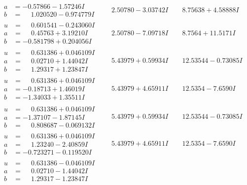 \documentclass[1p]{elsarticle_modified}
\theoremstyle{definition}
\begin{document}
$$\begin{array}{c|c|c}
\begin{aligned}
a &= -0.57866 - 1.57246 I \\
b &= \phantom{-}1.020520 - 0.974779 I\end{aligned}
 & \phantom{-}2.50780 - 3.03742 I & \phantom{-}8.75638 + 4.58888 I \\ \hline\begin{aligned}
u &= \phantom{-}0.601541 - 0.243060 I \\
a &= \phantom{-}0.45763 + 3.19210 I \\
b &= -0.581798 + 0.204056 I\end{aligned}
 & \phantom{-}2.50780 - 7.09718 I & \phantom{-}8.7564 + 11.5171 I \\ \hline\begin{aligned}
u &= \phantom{-}0.631386 + 0.046109 I \\
a &= \phantom{-}0.02710 + 1.44042 I \\
b &= \phantom{-}1.29317 + 1.23847 I\end{aligned}
 & \phantom{-}5.43979 + 0.59934 I & \phantom{-}12.53544 - 0.73085 I \\ \hline\begin{aligned}
u &= \phantom{-}0.631386 + 0.046109 I \\
a &= -0.18713 + 1.46019 I \\
b &= -1.34033 + 1.35511 I\end{aligned}
 & \phantom{-}5.43979 + 4.65911 I & \phantom{-}12.5354 - 7.6590 I \\ \hline\begin{aligned}
u &= \phantom{-}0.631386 + 0.046109 I \\
a &= -1.37107 - 1.87145 I \\
b &= \phantom{-}0.808687 - 0.069132 I\end{aligned}
 & \phantom{-}5.43979 + 0.59934 I & \phantom{-}12.53544 - 0.73085 I \\ \hline\begin{aligned}
u &= \phantom{-}0.631386 + 0.046109 I \\
a &= \phantom{-}1.23240 - 2.40859 I \\
b &= -0.723271 - 0.119520 I\end{aligned}
 & \phantom{-}5.43979 + 4.65911 I & \phantom{-}12.5354 - 7.6590 I \\ \hline\begin{aligned}
u &= \phantom{-}0.631386 - 0.046109 I \\
a &= \phantom{-}0.02710 - 1.44042 I \\
b &= \phantom{-}1.29317 - 1.23847 I\end{aligned}

\end{array}$$
\end{document}
